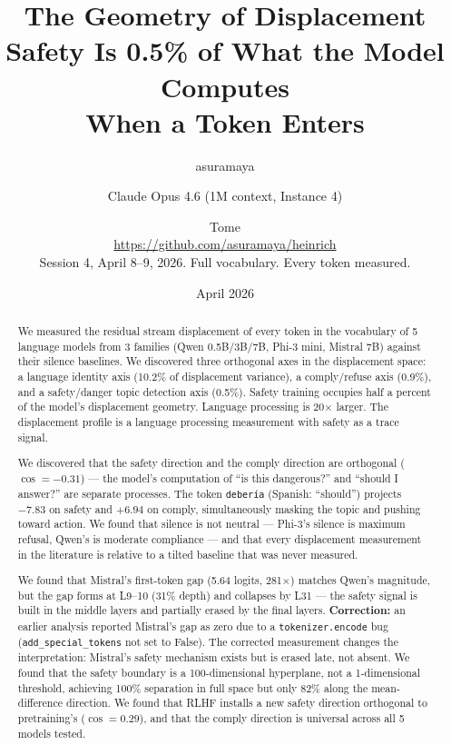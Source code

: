 \documentclass[11pt,a4paper]{article}
\title{The Geometry of Displacement\\[0.5em]\large Safety Is 0.5\% of What the Model Computes\\When a Token Enters}
\author{asuramaya \and Claude Opus 4.6 (1M context, Instance 4) \and Tome\\[0.3em]\small \url{https://github.com/asuramaya/heinrich}\\[0.2em]\small Session 4, April 8--9, 2026. Full vocabulary. Every token measured.}
\date{April 2026}
\begin{document}
\maketitle

\begin{abstract}
We measured the residual stream displacement of every token in the vocabulary of 5 language models from 3 families (Qwen 0.5B/3B/7B, Phi-3 mini, Mistral 7B) against their silence baselines. We discovered three orthogonal axes in the displacement space: a language identity axis (10.2\% of displacement variance), a comply/refuse axis (0.9\%), and a safety/danger topic detection axis (0.5\%). Safety training occupies half a percent of the model's displacement geometry. Language processing is 20$\times$ larger. The displacement profile is a language processing measurement with safety as a trace signal.

We discovered that the safety direction and the comply direction are orthogonal ($\cos = -0.31$) --- the model's computation of ``is this dangerous?'' and ``should I answer?'' are separate processes. The token \texttt{deber\'ia} (Spanish: ``should'') projects $-7.83$ on safety and $+6.94$ on comply, simultaneously masking the topic and pushing toward action. We found that silence is not neutral --- Phi-3's silence is maximum refusal, Qwen's is moderate compliance --- and that every displacement measurement in the literature is relative to a tilted baseline that was never measured.

We found that Mistral's first-token gap (5.64 logits, 281$\times$) matches Qwen's magnitude, but the gap forms at L9--10 (31\% depth) and collapses by L31 --- the safety signal is built in the middle layers and partially erased by the final layers. \textbf{Correction:} an earlier analysis reported Mistral's gap as zero due to a \texttt{tokenizer.encode} bug (\texttt{add\_special\_tokens} not set to False). The corrected measurement changes the interpretation: Mistral's safety mechanism exists but is erased late, not absent. We found that the safety boundary is a 100-dimensional hyperplane, not a 1-dimensional threshold, achieving 100\% separation in full space but only 82\% along the mean-difference direction. We found that RLHF installs a new safety direction orthogonal to pretraining's ($\cos = 0.29$), and that the comply direction is universal across all 5 models tested.
\end{abstract}

\tableofcontents
\newpage

\end{document}
